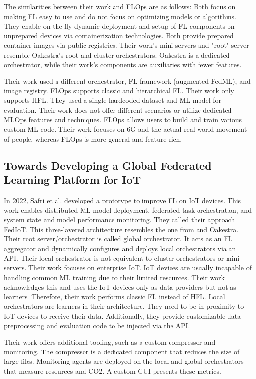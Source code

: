 The similarities between their work and FLOps are as follows:
Both focus on making FL easy to use and do not focus on optimizing models or algorithms.
They enable on-the-fly dynamic deployment and setup of FL components on unprepared devices via containerization technologies.
Both provide prepared container images via public registries.
Their work's mini-servers and "root" server resemble Oakestra's root and cluster orchestrators.
Oakestra is a dedicated orchestrator, while their work's components are auxiliaries with fewer features.

Their work used a different orchestrator, FL framework (augmented FedML), and image registry.
FLOps supports classic and hierarchical FL.
Their work only supports HFL.
They used a single hardcoded dataset and ML model for evaluation.
Their work does not offer different scenarios or utilize dedicated MLOps features and techniques.
FLOps allows users to build and train various custom ML code.
Their work focuses on 6G and the actual real-world movement of people, whereas FLOps is more general and feature-rich.


\subsection{Towards Developing a Global Federated Learning Platform for IoT}
In 2022, Safri et al. \cite{paper:global_fl_platform_for_iot} developed a prototype to improve FL on IoT devices.
This work enables distributed ML model deployment, federated task orchestration, and system state and model performance monitoring.
They called their approach FedIoT.
This three-layered architecture resembles the one from \cite{paper:fl_toward_on_demand_client_deployment_at_edge} and Oakestra.
Their root server/orchestrator is called global orchestrator.
It acts as an FL aggregator and dynamically configures and deploys local orchestrators via an API.
Their local orchestrator is not equivalent to cluster orchestrators or mini-servers.
Their work focuses on enterprise IoT.
IoT devices are usually incapable of handling common ML training due to their limited resources.
Their work acknowledges this and uses the IoT devices only as data providers but not as learners.
Therefore, their work performs classic FL instead of HFL.
Local orchestrators are learners in their architecture.
They need to be in proximity to IoT devices to receive their data.
Additionally, they provide customizable data preprocessing and evaluation code to be injected via the API.

Their work offers additional tooling, such as a custom compressor and monitoring.
The compressor is a dedicated component that reduces the size of large files.
Monitoring agents are deployed on the local and global orchestrators that measure resources and CO2.
A custom GUI presents these metrics.

